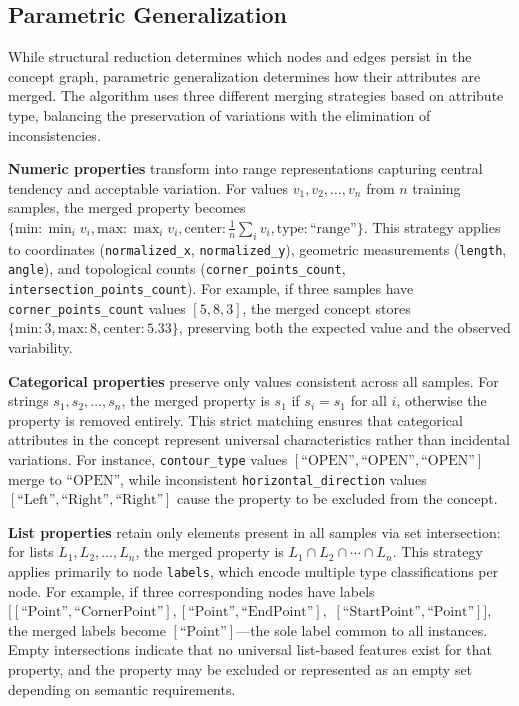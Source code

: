 \documentclass[runningheads]{llncs}
\begin{document}
\subsection{Parametric Generalization} \label{subsec:parametric_generalization}

While structural reduction determines which nodes and edges persist in the concept graph, parametric generalization determines how their attributes are merged. The algorithm uses three different merging strategies based on attribute type, balancing the preservation of variations with the elimination of inconsistencies.

\textbf{Numeric properties} transform into range representations capturing central tendency and acceptable variation. For values \(v_1, v_2, \ldots, v_n\) from \(n\) training samples, the merged property becomes \(\{\text{min}: \min_i v_i, \text{max}: \max_i v_i, \text{center}: \frac{1}{n}\sum_i v_i, \text{type}: \text{``range''}\}\). This strategy applies to coordinates (\texttt{normalized\_x}, \texttt{normalized\_y}), geometric measurements (\texttt{length}, \texttt{angle}), and topological counts (\texttt{corner\_points\_count}, \texttt{intersection\_points\_count}). For example, if three samples have \texttt{corner\_points\_count} values \([5, 8, 3]\), the merged concept stores \(\{\text{min}: 3, \text{max}: 8, \text{center}: 5.33\}\), preserving both the expected value and the observed variability.

\textbf{Categorical properties} preserve only values consistent across all samples. For strings \(s_1, s_2, \ldots, s_n\), the merged property is \(s_1\) if \(s_i = s_1\) for all \(i\), otherwise the property is removed entirely. This strict matching ensures that categorical attributes in the concept represent universal characteristics rather than incidental variations. For instance, \texttt{contour\_type} values \([\text{``OPEN''}, \text{``OPEN''}, \text{``OPEN''}]\) merge to \(\text{``OPEN''}\), while inconsistent \texttt{horizontal\_direction} values \([\text{``Left''}, \text{``Right''}, \text{``Right''}]\) cause the property to be excluded from the concept.

\textbf{List properties} retain only elements present in all samples via set intersection: for lists \(L_1, L_2, \ldots, L_n\), the merged property is \(L_1 \cap L_2 \cap \cdots \cap L_n\). This strategy applies primarily to node \texttt{labels}, which encode multiple type classifications per node. For example, if three corresponding nodes have labels \([[\text{``Point''}, \text{``CornerPoint''}], [\text{``Point''}, \text{``EndPoint''}],\) \([\text{``StartPoint''}, \text{``Point''}]]\), the merged labels become \([\text{``Point''}]\)---the sole label common to all instances. Empty intersections indicate that no universal list-based features exist for that property, and the property may be excluded or represented as an empty set depending on semantic requirements.
\end{document}
